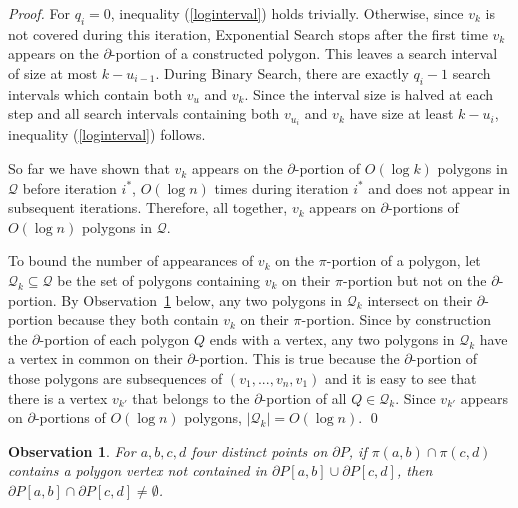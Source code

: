 \documentclass{llncs}
\newtheorem{obs}{Observation}
\begin{document}
\begin{proof}
For $q_i = 0$, inequality (\ref{loginterval}) holds trivially. Otherwise, since $v_k$ is not covered during this iteration, Exponential Search stops after the first time $v_k$ appears on the $\partial$-portion of a constructed polygon. This leaves a search interval of size at most $k-u_{i-1}$. During Binary Search, there are exactly $q_i-1$ search intervals which contain both $v_u$ and $v_k$. Since the interval size is halved at each step and all search intervals containing both $v_{u_i}$ and $v_k$ have size at least $k-u_i$,  inequality (\ref{loginterval}) follows.

So far we have shown that $v_k$ appears on the $\partial$-portion of $O(\log k)$ polygons in $\mathcal{Q}$ before iteration $i^*$, $O(\log n)$ times during iteration $i^*$ and does not appear in subsequent iterations.  Therefore, all together, $v_k$ appears on  $\partial$-portions of $O(\log n)$ polygons in $\mathcal{Q}$.

To bound the number of appearances of $v_k$ on the $\pi$-portion of a polygon, let $\mathcal{Q}_k \subseteq \mathcal{Q}$ be the set of polygons containing $v_k$ on their $\pi$-portion but not on the $\partial$-portion.  By Observation~\ref{obsPath} below, any two polygons in $\mathcal{Q}_k$ intersect on their $\partial$-portion because they both contain $v_k$ on their $\pi$-portion. Since by construction the $\partial$-portion of each polygon $Q$ ends with a vertex, any two polygons in $\mathcal{Q}_k$ have a vertex in common on their $\partial$-portion.  This is true because the $\partial$-portion of those polygons are subsequences of $(v_1, ..., v_{n}, v_1)$ and it is easy to see that there is a vertex $v_{k'}$ that belongs to the $\partial$-portion of  all $Q \in \mathcal{Q}_k$.  Since $v_{k'}$ appears on  $\partial$-portions of $O(\log n)$ polygons, $|\mathcal{Q}_k| = O(\log n)$.
\qed
\end{proof}

\begin{obs}
For $a,b,c,d$ four distinct points on $\partial P$, if $\pi(a,b) \cap \pi(c,d)$ contains a polygon vertex not contained in $\partial P[a,b] \cup \partial P[c,d]$, then $\partial P[a,b] \cap \partial P[c,d] \neq \emptyset$. 
\label{obsPath}
\end{obs}
\end{document}
